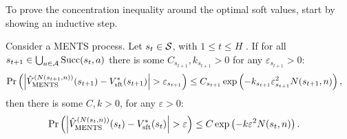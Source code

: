     To prove the concentration inequality around the optimal soft values, start by showing an inductive step.

    
    \begin{lemma} \label{lem:ments_val_induction_step}
        Consider a MENTS process. Let $s_t\in\mathcal{S}$, with $1\leq t \leq H$ . If for all $s_{t+1}\in\bigcup_{a\in\mathcal{A}}{\textnormal{Succ}(s_t,a)}$ there is some $C_{s_{t+1}},k_{s_{t+1}}>0$ for any $\varepsilon_{s_{t+1}}>0$:
        \begin{align}
            \Pr\left(\left| {\hat{V}^{(N(s_{t+1},n))}_{{\textnormal{MENTS}}}}(s_{t+1}) - V_{{\textnormal{sft}}}^*(s_{t+1}) \right| > \varepsilon_{s_{t+1}} \right) 
                &\leq C_{s_{t+1}}\exp\left( -k_{s_{t+1}}\varepsilon_{s_{t+1}}^2 N(s_{t+1},n) \right), 
        \end{align}
        then there is some $C,k>0$, for any $\varepsilon>0$:
        \begin{align}
            \Pr\left(\left| {\hat{V}^{(N(s_{t},n))}_{{\textnormal{MENTS}}}}(s_t) - V_{{\textnormal{sft}}}^*(s_{t}) \right| > \varepsilon \right) 
                &\leq C\exp\left( -k\varepsilon^2 N(s_{t},n) \right).
        \end{align}
    \end{lemma}
    
